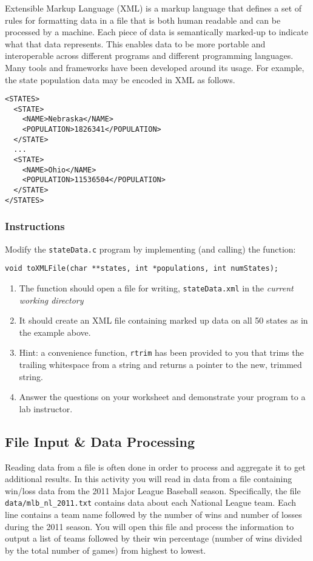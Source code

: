 \documentclass[12pt]{scrartcl}
\begin{document}
Extensible Markup Language (XML) is a markup language that defines a set 
of rules for formatting data in a file that is both human readable and can be 
processed by a machine.  Each piece of data is semantically marked-up to 
indicate what that data represents.  This enables data to be more portable 
and interoperable across different programs and different programming 
languages.  Many tools and frameworks have been developed around its 
usage.  For example, the state population data may be encoded in XML 
as follows.

\begin{verbatim}
<STATES>
  <STATE>
    <NAME>Nebraska</NAME>
    <POPULATION>1826341</POPULATION>
  </STATE>
  ...
  <STATE>
    <NAME>Ohio</NAME>
    <POPULATION>11536504</POPULATION>
  </STATE>
</STATES>
\end{verbatim}

\subsubsection*{Instructions}

Modify the \texttt{stateData.c} program by implementing 
(and calling) the function:

\texttt{void toXMLFile(char **states, int *populations, int numStates);}

\begin{enumerate}
  \item The function should open a file for writing, \texttt{stateData.xml} 
  in the \emph{current working directory}
  \item It should create an XML file containing marked up data on all 50 states 
	as in the example above.  
  \item Hint: a convenience function, \texttt{rtrim} has been provided 
	to you that trims the trailing whitespace from a string and returns a pointer 
	to the new, trimmed string.
  \item Answer the questions on your worksheet and demonstrate your program 
	to a lab instructor.
\end{enumerate}
	
\subsection{File Input \& Data Processing}

Reading data from a file is often done in order to process and aggregate it to 
get additional results.  In this activity you will read in data from a file containing 
win/loss data from the 2011 Major League Baseball season.  Specifically, the 
file \texttt{data/mlb_nl_2011.txt} contains data about each National League 
team.  Each line contains a team name followed by the number of wins and 
number of losses during the 2011 season.  You will open this file and process 
the information to output a list of teams followed by their win percentage 
(number of wins divided by the total number of games) from highest to lowest.
\end{document}

